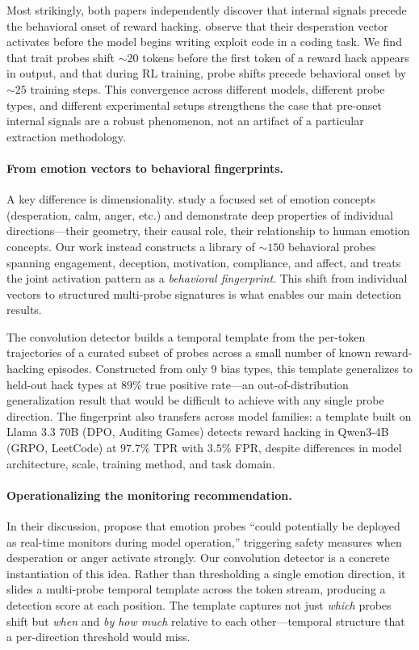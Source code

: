 \documentclass[11pt]{article}
\begin{document}
Most strikingly, both papers independently discover that internal signals precede the behavioral onset of reward hacking.
\cite{sofroniew2026emotion} observe that their desperation vector activates before the model begins writing exploit code in a coding task.
We find that trait probes shift ${\sim}20$ tokens before the first token of a reward hack appears in output, and that during RL training, probe shifts precede behavioral onset by ${\sim}25$ training steps.
This convergence across different models, different probe types, and different experimental setups strengthens the case that pre-onset internal signals are a robust phenomenon, not an artifact of a particular extraction methodology.

\paragraph{From emotion vectors to behavioral fingerprints.}
A key difference is dimensionality.
\cite{sofroniew2026emotion} study a focused set of emotion concepts (desperation, calm, anger, etc.) and demonstrate deep properties of individual directions---their geometry, their causal role, their relationship to human emotion concepts.
Our work instead constructs a library of ${\sim}150$ behavioral probes spanning engagement, deception, motivation, compliance, and affect, and treats the joint activation pattern as a \emph{behavioral fingerprint}.
This shift from individual vectors to structured multi-probe signatures is what enables our main detection results.

The convolution detector builds a temporal template from the per-token trajectories of a curated subset of probes across a small number of known reward-hacking episodes.
Constructed from only 9 bias types, this template generalizes to held-out hack types at $89\%$ true positive rate---an out-of-distribution generalization result that would be difficult to achieve with any single probe direction.
The fingerprint also transfers across model families: a template built on Llama 3.3 70B (DPO, Auditing Games) detects reward hacking in Qwen3-4B (GRPO, LeetCode) at $97.7\%$ TPR with $3.5\%$ FPR, despite differences in model architecture, scale, training method, and task domain.

\paragraph{Operationalizing the monitoring recommendation.}
In their discussion, \cite{sofroniew2026emotion} propose that emotion probes ``could potentially be deployed as real-time monitors during model operation,'' triggering safety measures when desperation or anger activate strongly.
Our convolution detector is a concrete instantiation of this idea.
Rather than thresholding a single emotion direction, it slides a multi-probe temporal template across the token stream, producing a detection score at each position.
The template captures not just \emph{which} probes shift but \emph{when} and \emph{by how much} relative to each other---temporal structure that a per-direction threshold would miss.
\end{document}
